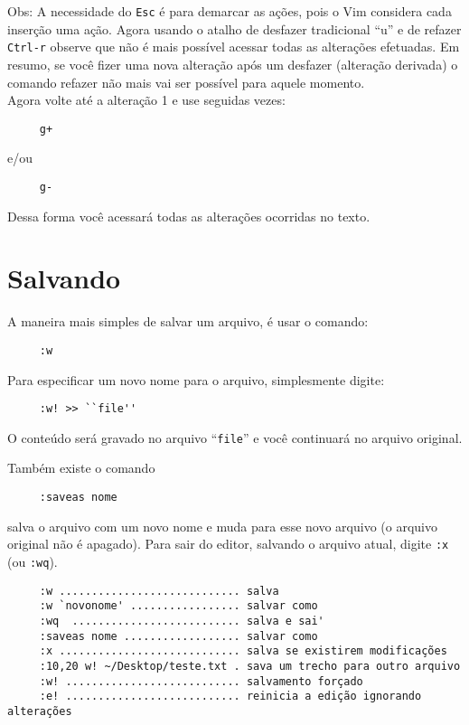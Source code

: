 Obs: A necessidade do {\tt Esc} é para demarcar as ações, pois o Vim
considera cada inserção uma ação.  Agora usando o atalho de desfazer
tradicional ``u'' e de refazer {\tt Ctrl-r} observe que não é mais possível
acessar todas as alterações efetuadas. Em resumo, se você fizer uma
nova alteração após um desfazer (alteração derivada) o comando refazer
não mais vai ser possível para aquele momento. \\

Agora volte até a alteração 1 e use seguidas vezes:

\begin{verbatim}
     g+
\end{verbatim}

e/ou

\begin{verbatim}
     g-
\end{verbatim}

Dessa forma você acessará todas as alterações ocorridas no texto.

\section{Salvando}
\label{sec:Salvando}

A maneira mais simples de salvar um arquivo, é usar o comando:

\begin{verbatim}
     :w
\end{verbatim}


Para especificar um novo nome para o arquivo, simplesmente digite:

\begin{verbatim}
     :w! >> ``file''
\end{verbatim}

O conteúdo será gravado no arquivo ``{\tt file}'' e você continuará no arquivo original.

Também existe o comando

\begin{verbatim}
     :saveas nome
\end{verbatim}

salva o arquivo com um novo nome e muda para esse novo arquivo (o arquivo
original não é apagado).  Para sair do editor, salvando o arquivo atual, digite
{\tt :x} (ou {\tt :wq}).

\begin{verbatim}
     :w ............................ salva
     :w `novonome' ................. salvar como
     :wq  .......................... salva e sai'
     :saveas nome .................. salvar como
     :x ............................ salva se existirem modificações
     :10,20 w! ~/Desktop/teste.txt . sava um trecho para outro arquivo
     :w! ........................... salvamento forçado
     :e! ........................... reinicia a edição ignorando alterações
\end{verbatim}

